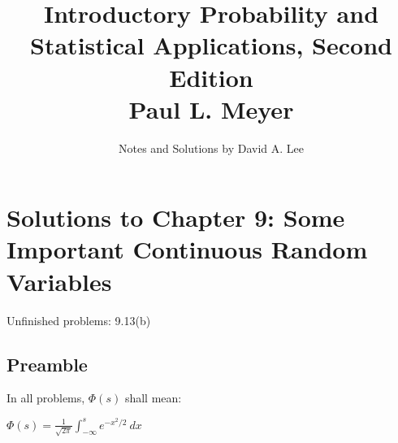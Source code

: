 \documentclass[10pt, oneside]{article}   	%
\title{Introductory Probability and Statistical Applications, Second Edition \\
\large{Paul L. Meyer}}
\author{Notes and Solutions by David A. Lee}
\date{}							%
\theoremstyle{definition}
\begin{document}
\maketitle
\section*{Solutions to Chapter 9: Some Important Continuous Random Variables}

Unfinished problems: 9.13(b)

\subsection*{Preamble}

In all problems, $\Phi(s)$ shall mean:

$\Phi(s) = \frac{1}{\sqrt{2 \pi}} \int^s_{-\infty} e^{-x^2/2} \ dx$
\end{document}
